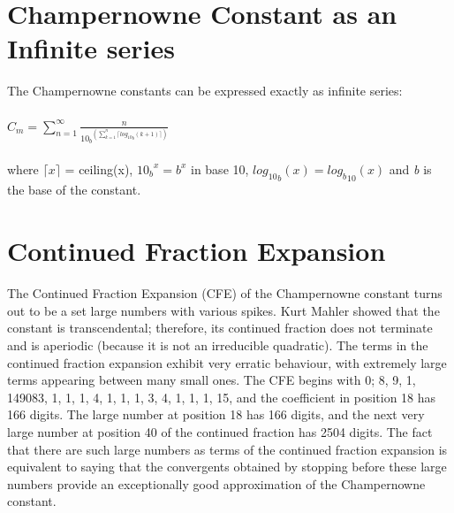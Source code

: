 \documentclass[12pt, a4paper]{report}
\begin{document}
\section{Champernowne Constant as an Infinite series}
\quad The Champernowne constants can be expressed exactly as infinite series:\\\\
\hspace*{30mm} $\displaystyle C_m = \sum_{n=1}^{\infty} \frac{n}{{10_b}^{\displaystyle (\sum_{k=1}^n \lceil {log_{10}}_b (k+1) \rceil)}}$\\\\
where $\lceil x \rceil $ = ceiling(x), ${10_b}^x = b^x$ in base 10, ${log_{10}}_b (x) = {log_b}_{10} (x)$ and {\it b} is the base of the constant.\\
\section{Continued Fraction Expansion}
\quad The Continued Fraction Expansion (CFE) of the Champernowne constant turns out to be a set large numbers with various spikes. Kurt Mahler showed that the constant is transcendental; therefore, its continued fraction does not terminate and is aperiodic (because it is not an irreducible quadratic). The terms in the continued fraction expansion exhibit very erratic behaviour, with extremely large terms appearing between many small ones. The CFE begins with 0; 8, 9, 1, 149083, 1, 1, 1, 4, 1, 1, 1, 3, 4, 1, 1, 1, 15, and the coefficient in position 18 has 166 digits. The large number at position 18 has 166 digits, and the next very large number at position 40 of the continued fraction has 2504 digits. The fact that there are such large numbers as terms of the continued fraction expansion is equivalent to saying that the convergents obtained by stopping before these large numbers provide an exceptionally good approximation of the Champernowne constant.\\\\
\end{document}
